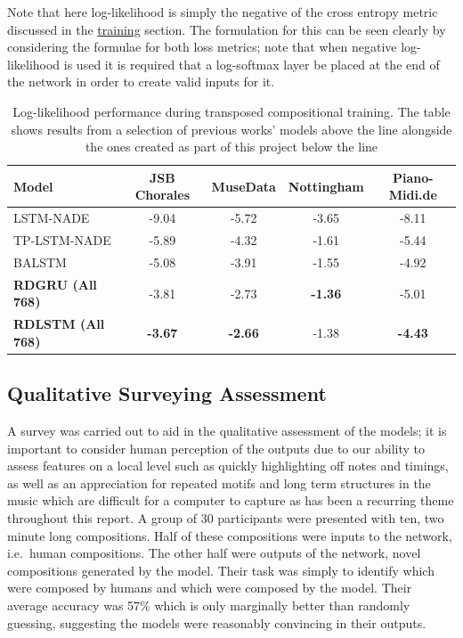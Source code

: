 \documentclass[12pt,]{article}
\begin{document}
Note that here log-likelihood is simply the negative of the cross
entropy metric discussed in the \protect\hyperlink{training}{training}
section. The formulation for this can be seen clearly by considering the
formulae for both loss metrics; note that when negative log-likelihood
is used it is required that a log-softmax layer be placed at the end of
the network in order to create valid inputs for it.

\begin{table}[H]
\centering
\caption{Log-likelihood performance during transposed compositional training. The table shows results from a selection of previous works’ models above the line alongside the ones created as part of this project below the line}
\vspace{1em}
\begin{tabular}{lcccc} 
\toprule
\textbf{Model}    & \textbf{JSB Chorales} & \textbf{MuseData} & \textbf{Nottingham} & \textbf{Piano-Midi.de}  \\ 
\midrule
LSTM-NADE         & -9.04                 & -5.72             & -3.65               & -8.11                   \\
TP-LSTM-NADE      & -5.89                 & -4.32             & -1.61               & -5.44                   \\
BALSTM            & -5.08                 & -3.91             & -1.55               & -4.92                   \\
\midrule
\textbf{RDGRU (All 768)}  & -3.81                 & -2.73             & \textbf{-1.36}      & -5.01                   \\
\textbf{RDLSTM (All 768)} & \textbf{-3.67}        & \textbf{-2.66}    & -1.38               & \textbf{-4.43}          \\
\bottomrule
\end{tabular}
\end{table}

\hypertarget{qualitative-surveying-assessment}{%
\subsection{Qualitative Surveying
Assessment}\label{qualitative-surveying-assessment}}

A survey was carried out to aid in the qualitative assessment of the
models; it is important to consider human perception of the outputs due
to our ability to assess features on a local level such as quickly
highlighting off notes and timings, as well as an appreciation for
repeated motifs and long term structures in the music which are
difficult for a computer to capture as has been a recurring theme
throughout this report. A group of 30 participants were presented with
ten, two minute long compositions. Half of these compositions were
inputs to the network, i.e.~human compositions. The other half were
outputs of the network, novel compositions generated by the model. Their
task was simply to identify which were composed by humans and which were
composed by the model. Their average accuracy was 57\% which is only
marginally better than randomly guessing, suggesting the models were
reasonably convincing in their outputs.
\end{document}
